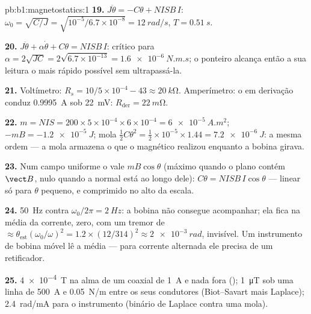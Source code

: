 \begin{solution}{pb:b1:magnetostatics:1}
\textbf{19.} $J\ddot\theta = -C\theta + NISB\,I$: $\omega_0 = \sqrt{C/J} = \sqrt{10^{-5}/6.7
\times 10^{-8}} = \qty{12}{rad/s}$, $T = \qty{0.51}{s}$.

\textbf{20.} $J\ddot\theta + \alpha\dot\theta + C\theta = NISB\,I$: crítico para
$\alpha = 2\sqrt{JC} = 2\sqrt{6.7 \times 10^{-13}} = \qty{1.6e-6}{N.m.s}$; o ponteiro
alcança então a sua leitura o mais rápido possível sem ultrapassá-la.

\textbf{21.} Voltímetro: $R_s = 10/5 \times 10^{-4} - 43 \approx \qty{20}{k\ohm}$.
Amperímetro: o  em derivação conduz \qty{0.9995}{A} sob \qty{22}{mV}: $R_{\text{der}} =
\qty{22}{m\ohm}$.

\textbf{22.} $m = NIS = 200 \times 5 \times 10^{-4} \times 6 \times 10^{-4} = \qty{6e-5}{A.m^2}$;
$-mB = \qty{-1.2e-5}{J}$; mola $\tfrac12C\theta^2 = \tfrac12 \times 10^{-5} \times 1.44 =
\qty{7.2e-6}{J}$: a mesma ordem --- a mola armazena o que o 
magnético realizou enquanto a bobina girava.

\textbf{23.} Num campo uniforme o  vale $mB\cos\theta$ (máximo quando
o plano contém $\vect B$, nulo quando a normal está ao longo dele): $C\theta =
NISB\,I\cos\theta$ --- linear só para $\theta$ pequeno, e comprimido no
alto da escala.

\textbf{24.} \qty{50}{Hz} contra $\omega_0/2\pi = \qty{2}{Hz}$: a bobina não consegue
acompanhar; ela fica na média da corrente, zero, com um tremor de
 $\approx \theta_{\text{est}}(\omega_0/\omega)^2 = 1.2 \times (12/314)^2 \approx
\qty{2e-3}{rad}$, invisível. Um instrumento de bobina móvel lê a média --- para
corrente alternada ele precisa de um retificador.

\textbf{25.} \qty{4e-4}{T} na alma de um coaxial de \qty{1}{A} e nada fora
(); \qty{1}{\micro T} sob uma linha de \qty{500}{A} e \qty{0.05}{N/m}
entre os seus condutores (Biot--Savart mais Laplace); \qty{2.4}{rad/mA} para
o instrumento (binário de Laplace contra uma mola).
\end{solution}
